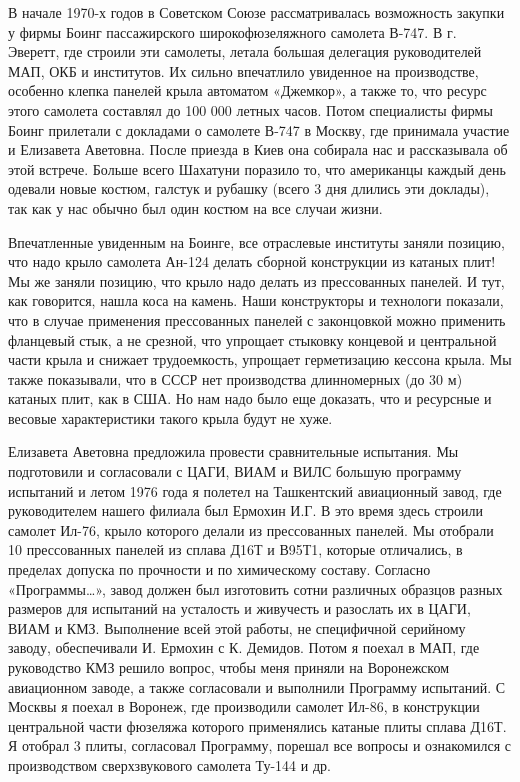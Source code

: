 В начале 1970-х годов в Советском Союзе рассматривалась возможность закупки у
фирмы Боинг пассажирского широкофюзеляжного самолета В-747. В г. Эверетт, где
строили эти самолеты, летала большая делегация руководителей МАП, ОКБ и
институтов. Их сильно впечатлило увиденное на производстве, особенно клепка
панелей крыла автоматом «Джемкор», а также то, что ресурс этого самолета
составлял до 100 000 летных часов. Потом специалисты фирмы Боинг прилетали с
докладами о самолете В-747 в Москву, где принимала участие и Елизавета
Аветовна. После приезда в Киев она собирала нас и рассказывала об этой встрече.
Больше всего Шахатуни поразило то, что американцы каждый день одевали новые
костюм, галстук и рубашку (всего 3 дня длились эти доклады), так как у нас
обычно был один костюм на все случаи жизни.

Впечатленные увиденным на Боинге, все отраслевые институты заняли позицию, что
надо крыло самолета Ан-124 делать сборной конструкции из катаных плит! Мы же
заняли позицию, что крыло надо делать из прессованных панелей. И тут, как
говорится, нашла коса на камень. Наши конструкторы и технологи показали, что в
случае применения прессованных панелей с законцовкой можно применить фланцевый
стык, а не срезной, что упрощает стыковку концевой и центральной части крыла и
снижает трудоемкость, упрощает герметизацию кессона крыла. Мы также показывали,
что в СССР нет производства длинномерных (до 30 м) катаных плит, как в США. Но
нам надо было еще доказать, что и ресурсные и весовые характеристики такого
крыла будут не хуже.

Елизавета Аветовна предложила провести сравнительные испытания. Мы подготовили
и согласовали с ЦАГИ, ВИАМ и ВИЛС большую программу испытаний и летом 1976 года
я полетел на Ташкентский авиационный завод, где руководителем нашего филиала
был Ермохин И.Г. В это время здесь строили самолет Ил-76, крыло которого делали
из прессованных панелей. Мы отобрали 10 прессованных панелей из сплава Д16Т и
В95Т1, которые отличались, в пределах допуска по прочности и по химическому
составу. Согласно «Программы…», завод должен был изготовить сотни различных
образцов разных размеров для испытаний на усталость и живучесть и разослать их
в ЦАГИ, ВИАМ и КМЗ. Выполнение всей этой работы, не специфичной серийному
заводу, обеспечивали И. Ермохин с К. Демидов. Потом я поехал в МАП, где
руководство КМЗ решило вопрос, чтобы меня приняли на Воронежском авиационном
заводе, а также согласовали и выполнили Программу испытаний. С Москвы я поехал
в Воронеж, где производили самолет Ил-86, в конструкции центральной части
фюзеляжа которого применялись катаные плиты сплава Д16Т. Я отобрал 3 плиты,
согласовал Программу, порешал все вопросы и ознакомился с производством
сверхзвукового самолета Ту-144 и др.

